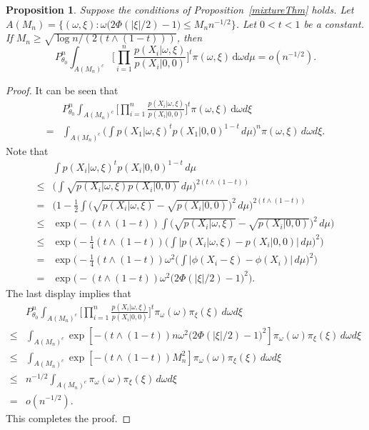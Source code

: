 \documentclass[11pt]{article}
\theoremstyle{plain}
\newtheorem{proposition}{\quad\quad Proposition}
\theoremstyle{definition}
\theoremstyle{remark}
\begin{document}
\begin{appendices}
\begin{proposition}\label{lastProp}
    Suppose the conditions of Proposition~\ref{mixtureThm} holds.
    Let $A(M_n)=\{(\omega, \xi): \omega \big( 2\Phi(|\xi|/2)-1\big)\leq M_n n^{-1/2}\}$.
    Let $0<t<1$ be a constant.
    If $M_n \geq \sqrt{{\log n}/(2(t\wedge (1-t)))}$, then
    \begin{equation*}
        P^n_{\theta_0} \int_{A(M_n)^c} \Big[\prod_{i=1}^n \frac{p(X_i|\omega,\xi)}{p(X_i|0,0)}\Big]^t \pi(\omega,\xi)\, \mathrm  d\omega d\mu =o(n^{-1/2}).
    \end{equation*}
\end{proposition}
\begin{proof}
    It can be seen that
\begin{equation*}
    \begin{split}
    &P^n_{\theta_0} \int_{A(M_n)^c} \Big[\prod_{i=1}^n \frac{p(X_i|\omega,\xi)}{p(X_i|0,0)}\Big]^t \pi(\omega,\xi)\, \mathrm d\omega d\xi
    \\
    =&
    \int_{A(M_n)^c} \big( \int p(X_1|\omega,\xi)^t p(X_1|0,0)^{1-t}\, d\mu\big)^n \pi(\omega,\xi)\, d\omega d\xi.
    \end{split}
\end{equation*}
Note that
\begin{align*}
    &\int p(X_i|\omega,\xi)^t p(X_i|0,0)^{1-t}\, d\mu
    \\
    \leq&  \Big(\int \sqrt{p(X_i|\omega,\xi) p(X_i|0,0)}\, d\mu\Big)^{2(t\wedge (1-t))}
    \\
= & \Big(1-\frac{1}{2}\int \big(\sqrt{p(X_i|\omega,\xi) }-\sqrt{p(X_i|0,0)}\big)^2\, d\mu\Big)^{2(t\wedge (1-t))}
\\
\leq & \exp \Big( -(t\wedge (1-t))\int \big(\sqrt{p(X_i|\omega,\xi) }-\sqrt{p(X_i|0,0)}\big)^2\, d\mu \Big)
\\
\leq & \exp \Big( -\frac{1}{4}(t\wedge (1-t)) \big(\int \big| p(X_i|\omega,\xi)-p(X_i|0,0)\big|\, d\mu \big)^2 \Big)
\\
= & \exp \Big( -\frac{1}{4}(t\wedge (1-t)) \omega^2 \big(\int \big| \phi(X_i -\xi)-\phi (X_i)\big|\, d\mu \big)^2 \Big)
\\
= & \exp \Big( -(t\wedge (1-t)) \omega^2 \big( 2\Phi(|\xi|/2)-1\big)^2 \Big).
\end{align*}
The last display implies that
\begin{align*}
    &P^n_{\theta_0} \int_{A(M_n)^c} \Big[\prod_{i=1}^n \frac{p(X_i|\omega,\xi)}{p(X_i|0,0)}\Big]^t \pi_{\omega}(\omega)\pi_{\xi}(\xi)\, d\omega d\xi
\\
    \leq
    &
    \int_{A(M_n)^c} \exp \left[ -(t\wedge (1-t)) n\omega^2 \big( 2\Phi(|\xi|/2)-1\big)^2 \right]
    \pi_{\omega}(\omega) \pi_\xi(\xi)\, d\omega d\xi
    \\
    \leq
    &
    \int_{A(M_n)^c} \exp \left[ -(t\wedge (1-t)) M_n^2 \right]
    \pi_{\omega}(\omega) \pi_\xi(\xi)\, d\omega d\xi
\\
    \leq
    &
    n^{-1/2}
    \int_{A(M_n)^c} 
\pi_{\omega}(\omega) \pi_\xi(\xi)\, d\omega d\xi
\\
=&o(n^{-1/2}).
\end{align*}
This completes the proof.





\end{proof}
\end{appendices}
\end{document}
